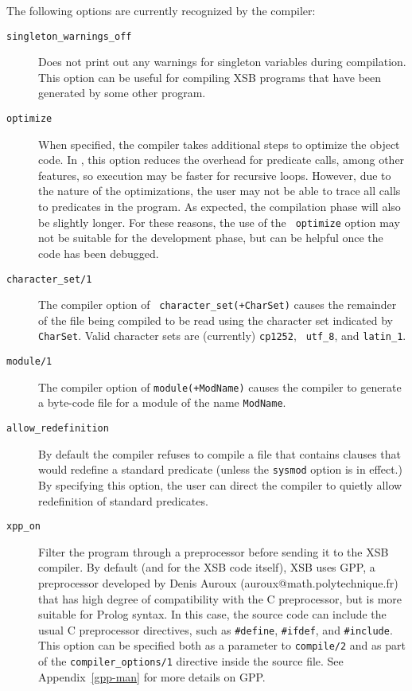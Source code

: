 The following options are currently recognized by the compiler:
\begin{description}
\item[{\tt singleton\_warnings\_off}] Does not print out any warnings
  for singleton variables during compilation.  This option can be
  useful for compiling XSB programs that have been generated by some
  other program.
%
\item[{\tt optimize}] When
  specified, the compiler takes additional steps to optimize the
  object code.  In \version, this option reduces the overhead for
  predicate calls, among other features, so execution may be faster
  for recursive loops.  However, due to the nature of the
  optimizations, the user may not be able to trace all calls to
  predicates in the program.  As expected, the compilation phase will
  also be slightly longer.  For these reasons, the use of the {\tt
    optimize} option may not be suitable for the development phase,
  but can be helpful once the code has been debugged.
%
\item[{\tt character\_set/1}] The compiler option of {\tt
  character\_set(+CharSet)} causes the remainder of the file being
  compiled to be read using the character set indicated by {\tt
    CharSet}.  Valid character sets are (currently) {\tt cp1252}, {\tt
    utf\_8}, and {\tt latin\_1}.
%
\item[{\tt module/1}] The compiler option of {\tt module(+ModName)}
  causes the compiler to generate a byte-code file for a module of the
  name {\tt ModName}.
%
\item[{\tt allow\_redefinition}] 
	By default the compiler refuses to compile a file that
	contains clauses that would redefine a standard predicate
	(unless the {\tt sysmod} option is in effect.)  By specifying
	this option, the user can direct the compiler to quietly allow
	redefinition of standard predicates.
%
\item[{\tt xpp\_on}] Filter the program through a
  preprocessor before sending it to the XSB compiler. By default (and
  for the XSB code itself), XSB uses GPP, a preprocessor developed by
  Denis Auroux (auroux@math.polytechnique.fr) that has high degree of
  compatibility with the C preprocessor, but is more suitable for
  Prolog syntax. In this case, the source code can include the usual C
  preprocessor directives, such as \verb|#define|, \verb|#ifdef|, and
  \verb|#include|. This option can be specified both as a parameter to
       {\tt compile/2} and as part of the {\tt compiler\_options/1}
       directive inside the source file. See Appendix~\ref{gpp-man}
       for more details on GPP.


\end{description}
